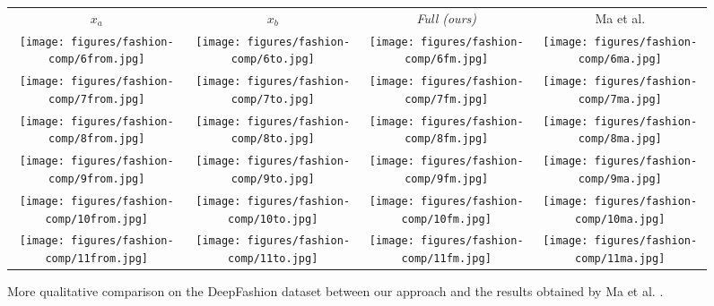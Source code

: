 \documentclass[10pt,twocolumn,letterpaper]{article}
\begin{document}
\begin{figure*}[h]
  \centering
  \setlength\tabcolsep{1.0pt}
\begin{tabular}{cccc}
$x_a$ & $x_b$  & \small\emph{Full (ours)}& Ma et al. \cite{ma2017pose}\\ 
\texttt{[image: figures/fashion-comp/6from.jpg]}
&\texttt{[image: figures/fashion-comp/6to.jpg]}
&\texttt{[image: figures/fashion-comp/6fm.jpg]}
&\texttt{[image: figures/fashion-comp/6ma.jpg]}
\\
\texttt{[image: figures/fashion-comp/7from.jpg]}
&\texttt{[image: figures/fashion-comp/7to.jpg]}
&\texttt{[image: figures/fashion-comp/7fm.jpg]}
&\texttt{[image: figures/fashion-comp/7ma.jpg]}
\\
\texttt{[image: figures/fashion-comp/8from.jpg]}
&\texttt{[image: figures/fashion-comp/8to.jpg]}
&\texttt{[image: figures/fashion-comp/8fm.jpg]}
&\texttt{[image: figures/fashion-comp/8ma.jpg]}
\\
\texttt{[image: figures/fashion-comp/9from.jpg]}
&\texttt{[image: figures/fashion-comp/9to.jpg]}
&\texttt{[image: figures/fashion-comp/9fm.jpg]}
&\texttt{[image: figures/fashion-comp/9ma.jpg]}
\\
\texttt{[image: figures/fashion-comp/10from.jpg]}
&\texttt{[image: figures/fashion-comp/10to.jpg]}
&\texttt{[image: figures/fashion-comp/10fm.jpg]}
&\texttt{[image: figures/fashion-comp/10ma.jpg]}
\\
\texttt{[image: figures/fashion-comp/11from.jpg]}
&\texttt{[image: figures/fashion-comp/11to.jpg]}
&\texttt{[image: figures/fashion-comp/11fm.jpg]}
&\texttt{[image: figures/fashion-comp/11ma.jpg]}
\end{tabular}
  \caption{More qualitative comparison on the DeepFashion dataset between our approach and the results obtained by Ma et al. \cite{ma2017pose}.}
\label{fig:comparison-Fashion-2}
\end{figure*}
\end{document}
